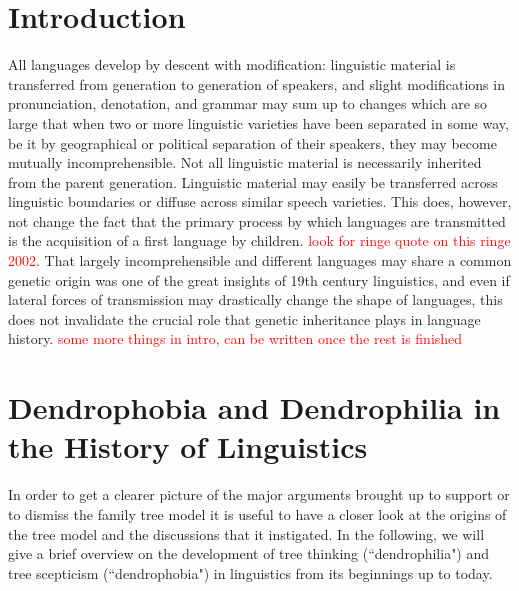 \documentclass[svgnames,12pt]{scrartcl}
\newcommand\Comment[1]{\textcolor{red}{#1}}
\begin{document}
\section{Introduction}
All languages develop by descent with modification: linguistic material is transferred from
generation to generation of speakers, and slight modifications in pronunciation, denotation, and
grammar may sum up to changes which are so large that when two or more linguistic varieties have been
separated in some way, be it by geographical or political separation of their speakers, they may
become mutually incomprehensible. Not all linguistic material is necessarily inherited from the
parent generation. Linguistic material may easily be transferred across linguistic boundaries or
diffuse across similar speech varieties. This does, however, not change the fact that the primary
process by which languages are transmitted is the acquisition of a first language by children.
\textcolor{red}{look for ringe quote on this ringe 2002}. That largely incomprehensible and
different languages may share a common genetic origin was one of the great insights of 19th century
linguistics, and even if lateral forces of transmission may drastically change the shape of
languages, this does not invalidate the crucial role that genetic inheritance plays in language
history. 
\Comment{some more things in intro, can be written once the rest is finished}
\section{Dendrophobia and Dendrophilia in the History of Linguistics}
In order to get a clearer picture of the major arguments brought up to support or to dismiss the
family tree model it is useful to have a closer look at the origins of the tree model and the
discussions that it instigated. In the following, we will give a brief overview on the development
of tree thinking (``dendrophilia") and tree scepticism (``dendrophobia") in linguistics from its
beginnings up to today.
\end{document}
